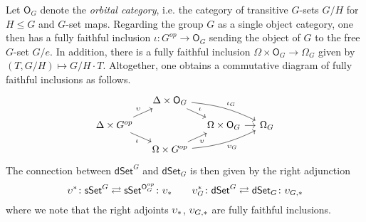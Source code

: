 \documentclass[a4paper,10pt
,draft
]{article}%
\numberwithin{equation}{section}
\numberwithin{figure}{section}
\theoremstyle{definition} %
\newcommand{\1}{\ensuremath{\mathbbm 1}}%
\begin{document}
Let $\mathsf{O}_G$
denote the \emph{orbital category},
i.e. the category of transitive $G$-sets $G/H$ for $H\leq G$ and $G$-set maps.
Regarding the group $G$ as a single object category,
one then has a fully faithful inclusion
$\iota \colon G^{op} \to \mathsf{O}_G$
sending the object of $G$ to the free $G$-set $G/e$. 
In addition, there is a fully faithful inclusion
$\Omega \times \mathsf{O}_G \to \Omega_G$
given by
$(T,G/H) \mapsto G/H \cdot T$.
Altogether, one obtains a commutative diagram of fully faithful inclusions as follows.
\begin{equation}
\begin{tikzcd}[row sep=9,column sep=11]
	&
	\Delta \times \mathsf{O}_G 
	\ar{rd}{\iota}
	\ar[bend left=10]{rrd}{\iota_G}
	&
\\
	\Delta \times G^{op} 
	\ar{ru}{\upsilon}
	\ar{rd}[swap]{\iota}
	&&
	\Omega \times \mathsf{O}_G
	\ar{r}
	&
	\Omega_G
\\
	&
	\Omega \times G^{op}
	\ar{ru}[swap]{\upsilon}
	\ar[bend right=10]{rru}[swap]{\upsilon_G}
	&
\end{tikzcd}
\end{equation}
The connection between 
$\mathsf{dSet}^G$ and $\mathsf{dSet}_G$
is then given by the right adjunction
\begin{equation}\label{UPSILONADJ EQ}
	\upsilon^{\**} \colon 
	\mathsf{sSet}^G
	\rightleftarrows
	\mathsf{sSet}^{\mathsf{O}_G^{op}}
	\colon
	\upsilon_{\**}
\qquad
	\upsilon_G^{\**} \colon 
	\mathsf{dSet}^G
	\rightleftarrows
	\mathsf{dSet}_G
	\colon
	\upsilon_{G,\**}
\end{equation}
where we note that the right adjoints 
$\upsilon_{\**}$, $\upsilon_{G,\**}$
are fully faithful inclusions.
\end{document}
